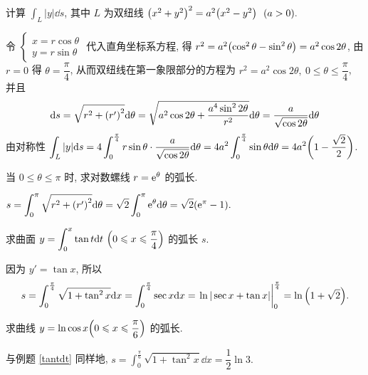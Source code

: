 \begin{example}
    计算 $\displaystyle \int_{L}|y|\dd s$, 其中 $L$ 为双纽线 $\qty(x^2+y^2)^2=a^2\qty(x^2-y^2)~~(a>0).$
\end{example}
\begin{solution}
    令 $\begin{cases}
            x=r\cos\theta \\
            y=r\sin\theta
        \end{cases}$ 代入直角坐标系方程, 得 $r^2=a^2\qty(\cos^2\theta-\sin^2\theta)=a^2\cos 2\theta$, 由 $r=0$ 得 $\theta=\dfrac{\pi}{4}$, 从而双纽线在第一象限部分的方程为 $r^2=a^2\cos2\theta,~0\leqslant\theta\leqslant \dfrac{\pi}{4}$,
    并且 $$\dd s=\sqrt{r^2+\qty(r')^2}\dd \theta=\sqrt{a^2\cos2\theta+\dfrac{a^4\sin ^22\theta}{r^2}}\dd \theta=\dfrac{a}{\sqrt{\cos 2\theta}}\dd \theta$$
    由对称性 $\displaystyle \int_{L}|y|\dd s=4\int_{0}^{\frac{\pi}{4}}r\sin\theta\cdot\dfrac{a}{\sqrt{\cos 2\theta}}\dd \theta=4a^2\int_{0}^{\frac{\pi}{4}}\sin\theta\dd \theta=4a^2\qty(1-\dfrac{\sqrt{2}}{2})$.
\end{solution}

\begin{example}[2010 数二]
    当 $0\leqslant\theta\leqslant \pi$ 时, 求对数螺线 $r=\mathrm{e}^{\theta}$ 的弧长.
\end{example}
\begin{solution}
    $\displaystyle s=\int_{0}^{\pi}\sqrt{r^2+\qty(r')^2}\dd \theta=\sqrt{2}\int_{0}^{\pi}\mathrm{e}^\theta\dd \theta=\sqrt{2}\qty(\mathrm{e}^{\pi}-1).$
\end{solution}

\begin{example}[2011 数一]
    求曲面\label{tantdt} $\displaystyle y=\int_{0}^{x}\tan t\dd t~ \qty(0\leqslant x\leqslant \dfrac{\pi}{4})$ 的弧长 $s$.
\end{example}
\begin{solution}
    因为 $y'=\tan x$, 所以
    $$s=\int_{0}^{\frac{\pi}{4}}\sqrt{1+\tan^2x}\dd x=\int_{0}^{\frac{\pi}{4}}\sec x\dd x=\eval{\ln|\sec x+\tan x|}_{0}^{\frac{\pi}{4}}=\ln\qty(1+\sqrt{2}).$$
\end{solution}

\begin{example}[2019 数二]
    求曲线 $y=\ln\cos x\qty(0\leqslant x\leqslant \dfrac{\pi}{6})$ 的弧长.
\end{example}
\begin{solution}
    与例题 \ref{tantdt} 同样地, $\displaystyle s=\int_{0}^{\frac{\pi}{6}}\sqrt{1+\tan^2x}\dd x=\dfrac{1}{2}\ln 3.$
\end{solution}

